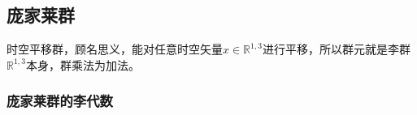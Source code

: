 
\subsection{庞家莱群}
时空平移群，顾名思义，能对任意时空矢量$x\in \mathbb R^{1,3} $进行平移，所以群元就是李群$\mathbb R^{1,3}$本身，群乘法为加法。

\subsubsection{庞家莱群的李代数}